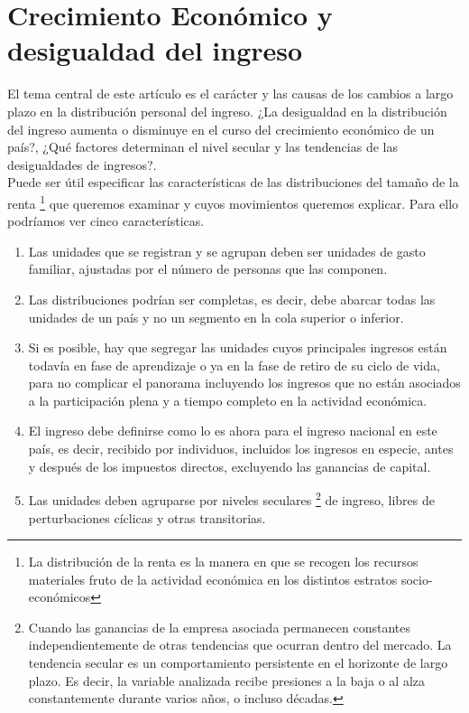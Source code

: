\chapter*{Crecimiento Económico y desigualdad del ingreso} 
El tema central de este artículo es el carácter y las causas de los cambios a largo plazo en la distribución personal del ingreso. ¿La desigualdad en la distribución del ingreso aumenta o disminuye en el curso del crecimiento económico de un país?, ¿Qué factores determinan el nivel secular y las tendencias de las desigualdades de ingresos?. \\
Puede ser útil especificar las características de las distribuciones del tamaño de la renta \footnote{La distribución de la renta es la manera en que se recogen los recursos materiales fruto de la actividad económica en los distintos estratos socio-económicos} que queremos examinar y cuyos movimientos queremos explicar. Para ello podríamos ver cinco características. 
\begin{enumerate}[1.]
    \item Las unidades que se registran y se agrupan deben ser unidades de gasto familiar, ajustadas por el número de personas que las componen.
    \item Las distribuciones podrían ser completas, es decir, debe abarcar todas las unidades de un país y no un segmento en la  cola superior o inferior. 
    \item Si es posible, hay que segregar las unidades cuyos principales ingresos están todavía en fase de aprendizaje o ya en la fase de retiro de su ciclo de vida, para no complicar el panorama incluyendo los ingresos que no están asociados a la participación plena y a tiempo completo en la actividad económica. 
    \item El ingreso debe definirse como lo es ahora para el ingreso nacional en este país, es decir, recibido por individuos, incluidos los ingresos en especie, antes y después de los impuestos directos, excluyendo las ganancias de capital. 
    \item Las unidades deben agruparse por niveles seculares \footnote{Cuando las ganancias de la empresa asociada permanecen constantes independientemente de otras tendencias que ocurran dentro del mercado. La tendencia secular es un comportamiento persistente en el horizonte de largo plazo. Es decir, la variable analizada recibe presiones a la baja o al alza constantemente durante varios años, o incluso décadas.} de ingreso, libres de perturbaciones cíclicas y otras transitorias.\\
\end{enumerate}
